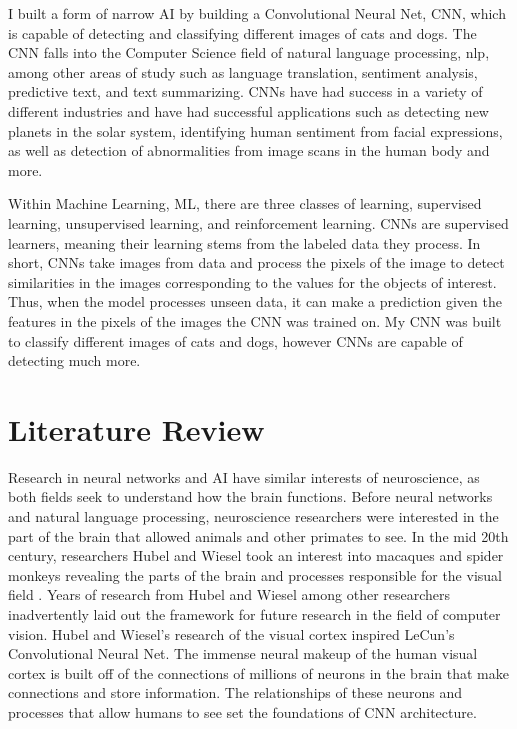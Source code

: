 \documentclass[12pt,english]{article}
\begin{document}
I built a form of narrow AI by building a Convolutional Neural Net, CNN, which is capable of detecting and classifying different images of cats and dogs. The CNN falls into the Computer Science field of natural language processing, nlp, among other areas of study such as language translation, sentiment analysis, predictive text, and text summarizing. CNNs have had success in a variety of different industries and have had successful applications such as detecting new planets in the solar system, identifying human sentiment from facial expressions, as well as detection of abnormalities from image scans in the human body and more.\par

Within Machine Learning, ML, there are three classes of learning, supervised learning, unsupervised learning, and reinforcement learning. CNNs are supervised learners, meaning their learning stems from the labeled data they process. In short, CNNs take images from data and process the pixels of the image to detect similarities in the images corresponding to the values for the objects of interest. Thus, when the model processes unseen data, it can make a prediction given the features in the pixels of the images the CNN was trained on. My CNN was built to classify different images of cats and dogs, however CNNs are capable of detecting much more.

\section{Literature Review}
Research in neural networks and AI have similar interests of neuroscience, as both fields seek to understand how the brain functions. Before neural networks and natural language processing, neuroscience researchers were interested in the part of the brain that allowed animals and other primates to see. In the mid 20th century, researchers Hubel and Wiesel took an interest into macaques and spider monkeys revealing the parts of the brain and processes responsible for the visual field \citep{hubel:monkey}. Years of research from Hubel and Wiesel among other researchers inadvertently laid out the framework for future research in the field of computer vision. 
Hubel and Wiesel’s research of the visual cortex inspired LeCun’s Convolutional Neural Net. The immense neural makeup of the human visual cortex is built off of the connections of millions of neurons in the brain that make connections and store information. The relationships of these neurons and processes that allow humans to see set the foundations of CNN architecture. \par
\end{document}
